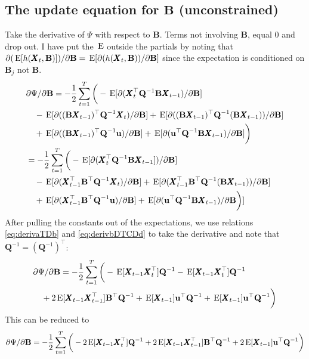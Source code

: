 \documentclass[]{article}
\def\BB{\mbox{$\mathbf B$}}	\def\bb{\mbox{$\mathbf b$}}
\def\QQ{\mbox{$\mathbf Q$}}	 \def\qq{\mbox{$\mathbf q$}}
\def\XX{\mbox{$\pmb{X}$}}	\def\xx{\mbox{$\pmb{x}$}}
\def\E{\,\textup{\textrm{E}}}
\begin{document}
\subsection{The update equation for $\BB$ (unconstrained)}
Take the derivative of $\Psi$ with respect to $\BB$.  Terms not involving $\BB$, equal 0 and drop out.  I have put the $\E$ outside the partials by noting that $\partial(\E[h(\XX_t,\BB)])/\partial\BB=\E[\partial(h(\XX_t,\BB))/\partial\BB]$ since the expectation is conditioned on $\BB_j$ not $\BB$. 
\begin{equation}\label{eq:B.unconstrained1}
\begin{split}
&\partial\Psi/\partial\BB = -\frac{1}{2} \sum_{t=1}^T\bigg(-\E[\partial(\XX_t^\top\QQ^{-1}\BB\XX_{t-1})/\partial\BB] \\
&\quad - \E[\partial((\BB\XX_{t-1})^\top\QQ^{-1}\XX_t)/\partial\BB] + \E[\partial((\BB\XX_{t-1})^\top\QQ^{-1}(\BB\XX_{t-1}))/\partial\BB] \\
&\quad +  \E[\partial((\BB\XX_{t-1})^\top\QQ^{-1}\uu)/\partial\BB] 
+ \E[\partial(\uu^\top\QQ^{-1}\BB\XX_{t-1})/\partial\BB]\bigg)\\
&= -\frac{1}{2} \sum_{t=1}^T\bigg(-\E[\partial(\XX_t^\top\QQ^{-1}\BB\XX_{t-1}])/\partial\BB] \\
&\quad - \E[\partial(\XX_{t-1}^\top\BB^\top\QQ^{-1}\XX_t)/\partial\BB] 
+ \E[\partial(\XX_{t-1}^\top\BB^\top\QQ^{-1}(\BB\XX_{t-1}))/\partial\BB] \\
&\quad +  \E[\partial(\XX_{t-1}^\top\BB^\top\QQ^{-1}\uu)/\partial\BB] 
+ \E[\partial(\uu^\top\QQ^{-1}\BB\XX_{t-1})/\partial\BB\bigg)]\\
\end{split}
\end{equation}
After pulling the constants out of the expectations, we use relations \ref{eq:derivaTDb} and \ref{eq:derivbDTCDd} to take the derivative and note that $\QQ^{-1} = (\QQ^{-1})^\top$:
\begin{equation}\label{eq:B.unconstrained2}
\begin{split}
&\partial\Psi/\partial\BB = -\frac{1}{2} \sum_{t=1}^T\bigg(-\E[\XX_{t-1}\XX_t^\top]\QQ^{-1} - \E[ \XX_{t-1}\XX_t^\top]\QQ^{-1} \\
&\quad + 2 \E[\XX_{t-1}\XX_{t-1}^\top]\BB^\top\QQ^{-1} + \E[\XX_{t-1}]\uu^\top\QQ^{-1}  + \E[\XX_{t-1}]\uu^\top\QQ^{-1} \bigg) \\
\end{split}
\end{equation}
This can be reduced to
\begin{equation}\label{eq:B.unconstrained3}
\partial\Psi/\partial\BB = -\frac{1}{2} \sum_{t=1}^T\bigg(-2\E[\XX_{t-1}\XX_t^\top]\QQ^{-1}  + 2 \E[\XX_{t-1}\XX_{t-1}^\top ]\BB^\top\QQ^{-1} 
+ 2\E[\XX_{t-1}]\uu^\top\QQ^{-1} \bigg)
\end{equation}
\end{document}
